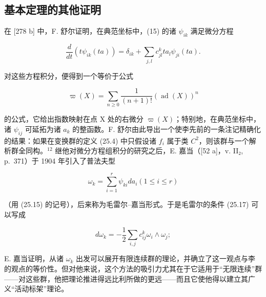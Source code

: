 \subsection*{基本定理的其他证明}
{}

在 {[}278 b{]} 中，F. 舒尔证明，在典范坐标中，(15) 的诸 \(\psi_{ik}\) 满足微分方程

\[
\frac {d}{d t} (t \psi_ {i k} (t a)) = \delta_ {i k} + \sum_ {j, l} c _ {j l} ^ {k} t a _ {l} \psi_ {j i} (t a).\tag{25.23}
\]

对这些方程积分，便得到一个等价于公式

\[
\varpi (X) = \sum_ {n \geq 0} \frac {1}{(n + 1) !} (\operatorname{ad} (X)) ^ {n}\tag{25.24}
\]

的公式，它给出指数映射在点 X 处的右微分 \(\varpi(X)\)；特别地，在典范坐标中，诸 \(\psi_{ij}\) 可延拓为诸 \(a_{k}\) 的整函数。F. 舒尔由此导出一个使李先前的一条注记精确化的结果：如果在变换群的定义 (25.4) 中只假设诸 \(f_{i}\) 属于类 \(C^{2}\)，则该群与一个解析群全同构。\(^{12}\) 继他对微分方程组积分的研究之后，E. 嘉当（{[}52 a{]}，v. II₂, p.~371）于 1904 年引入了普法夫型

\[
\omega_ {k} = \sum_ {i = 1} ^ {r} \psi_ {k i} d a _ {i} (1 \leq i \leq r)\tag{25.25}
\]

（用 (25.15) 的记号），后来称为毛雷尔–嘉当形式。于是毛雷尔的条件 (25.17) 可以写成

\[
d \omega_ {k} = - \frac {1}{2} \sum_ {i, j} c _ {i j} ^ {k} \omega_ {i} \wedge \omega_ {j};
\]

E. 嘉当证明，从诸 \(\omega_{k}\) 出发可以展开有限连续群的理论，并确立了这一观点与李的观点的等价性。但对他来说，这个方法的吸引力尤其在于它适用于“无限连续”群——对这些群，他把理论推进得远比利所做的更远——而且它使他得以建立其广义“活动标架”理论。


